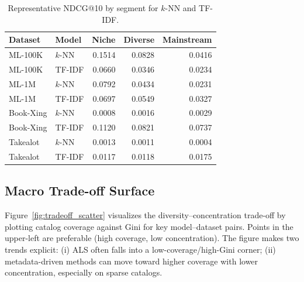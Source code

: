 \documentclass[conference]{IEEEtran}
\begin{document}
\begin{table}[!t]
  \centering
  \caption{Representative NDCG@10 by segment for $k$-NN and TF-IDF.}
  \label{tab:ndcg_summary}
  \begin{tabular}{@{}llrrr@{}}
    \toprule
    \textbf{Dataset} & \textbf{Model} & \textbf{Niche} & \textbf{Diverse} & \textbf{Mainstream} \\
    \midrule
    ML-100K & $k$-NN & 0.1514 & 0.0828 & 0.0416 \\
    ML-100K & TF-IDF & 0.0660 & 0.0346 & 0.0234 \\
    ML-1M & $k$-NN & 0.0792 & 0.0434 & 0.0231 \\
    ML-1M & TF-IDF & 0.0697 & 0.0549 & 0.0327 \\
    Book-Xing & $k$-NN & 0.0008 & 0.0016 & 0.0029 \\
    Book-Xing & TF-IDF & 0.1120 & 0.0821 & 0.0737 \\
    Takealot & $k$-NN & 0.0013 & 0.0011 & 0.0004 \\
    Takealot & TF-IDF & 0.0117 & 0.0118 & 0.0175 \\
    \bottomrule
  \end{tabular}
\end{table}

\subsection{Macro Trade-off Surface}

Figure~\ref{fig:tradeoff_scatter} visualizes the diversity--concentration trade-off by plotting catalog coverage against Gini for key model--dataset pairs. Points in the upper-left are preferable (high coverage, low concentration). The figure makes two trends explicit: (i) ALS often falls into a low-coverage/high-Gini corner; (ii) metadata-driven methods can move toward higher coverage with lower concentration, especially on sparse catalogs.
\end{document}
